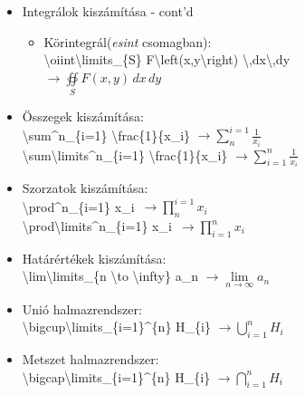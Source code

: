 \documentclass[aspectratio=169]{beamer}
\begin{document}
\begin{frame}
\begin{itemize}
\item Integrálok kiszámítása - cont'd
\begin{itemize}
\item Körintegrál(\textit{esint} csomagban):\\ \textbackslash oiint\textbackslash limits\_\{S\} F\textbackslash left(x,y\textbackslash right) \textbackslash,dx\textbackslash,dy\\$\rightarrow \oiint\limits_{S} F\left(x,y\right) \,dx\,dy$
\end{itemize}
\item Összegek kiszámítása:\\\textbackslash sum\^{}n\_\{i=1\} \textbackslash frac\{1\}\{x\_i\} $\rightarrow\sum_{n}^{i=1} \frac{1}{x_i}$\\\textbackslash sum\textbackslash limits\^{}n\_\{i=1\} \textbackslash frac\{1\}\{x\_i\} $\rightarrow\sum\limits^{n}_{i=1} \frac{1}{x_i}$
\item Szorzatok kiszámítása:\\\textbackslash prod\^{}n\_\{i=1\} x\_i\ $\rightarrow\prod_{n}^{i=1} x_i$\\\textbackslash prod\textbackslash limits\^{}n\_\{i=1\} x\_i\ $\rightarrow\prod\limits^{n}_{i=1} x_i$
\end{itemize}
\vfill

\pagebreak %

\begin{itemize}
\item Határértékek kiszámítása:\\\textbackslash lim\textbackslash limits\_\{n \textbackslash to \textbackslash infty\} a\_n $\rightarrow\lim\limits_{n \to \infty} a_n$

\item Unió halmazrendszer:\\\textbackslash bigcup\textbackslash limits\_\{i=1\}\^{}\{n\} H\_\{i\} $\rightarrow\bigcup\limits_{i=1}^{n} H_{i}$
\item Metszet halmazrendszer:\\\textbackslash bigcap\textbackslash limits\_\{i=1\}\^{}\{n\} H\_\{i\} $\rightarrow\bigcap\limits_{i=1}^{n} H_{i}$
\end{itemize}
\vfill
\end{frame}

\end{document}
